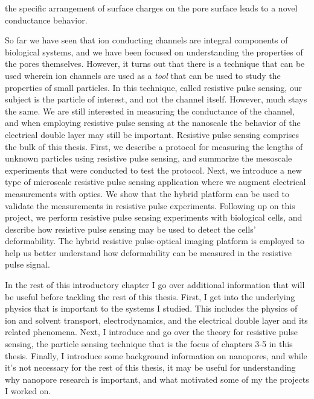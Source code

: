 the specific arrangement of surface charges on the pore surface leads to a novel conductance behavior.
	
	So far we have seen that ion conducting channels are integral components of biological systems, and we have been focused on understanding the properties of the pores themselves. However, it turns out that there is a technique that can be used wherein ion channels are used as a \textit{tool} that can be used to study the properties of small particles. In this technique, called resistive pulse sensing, our subject is the particle of interest, and not the channel itself. However, much stays the same. We are still interested in measuring the conductance of the channel, and when employing resistive pulse sensing at the nanoscale the behavior of the electrical double layer may still be important. Resistive pulse sensing comprises the bulk of this thesis. First, we describe a protocol for measuring the lengths of unknown particles using resistive pulse sensing, and summarize the mesoscale experiments that were conducted to test the protocol. Next, we introduce a new type of microscale resistive pulse sensing application where we augment electrical measurements with optics. We show that the hybrid platform can be used to validate the measurements in resistive pulse experiments. Following up on this project, we perform resistive pulse sensing experiments with biological cells, and describe how resistive pulse sensing may be used to detect the cells' deformability. The hybrid resistive pulse-optical imaging platform is employed to help us better understand how deformability can be measured in the resistive pulse signal.
	
	In the rest of this introductory chapter I go over additional information that will be useful before tackling the rest of this thesis. First, I get into the underlying physics that is important to the systems I studied. This includes the physics of ion and solvent transport, electrodynamics, and the electrical double layer and its related phenomena. Next, I introduce and go over the theory for resistive pulse sensing, the particle sensing technique that is the focus of chapters 3-5 in this thesis. Finally, I introduce some background information on nanopores, and while it's not necessary for the rest of this thesis, it may be useful for understanding why nanopore research is important, and what motivated some of my the projects I worked on.

	

	

